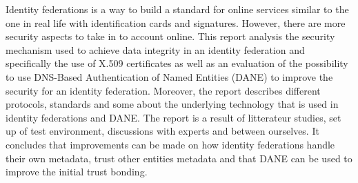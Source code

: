 Identity federations is a way to build a standard for online services similar to the one in real life with identification cards and signatures.
However, there are more security aspects to take in to account online.
This report analysis the security mechanism used to achieve data integrity in an identity federation and specifically the use of X.509 certificates as well as an evaluation of the possibility to use DNS-Based Authentication of Named Entities (DANE) to improve the security for an identity federation.
Moreover, the report describes different protocols, standards and some about the underlying technology that is used in identity federations and DANE. 
The report is a result of litterateur studies, set up of test environment, discussions with experts and between ourselves.
It concludes that improvements can be made on how identity federations handle their own metadata, trust other entities metadata and that DANE can be used to improve the initial trust bonding.





